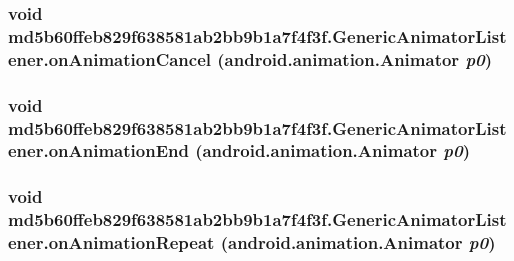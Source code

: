 \hypertarget{classmd5b60ffeb829f638581ab2bb9b1a7f4f3f_1_1_generic_animator_listener_b745db9d1bbb0cb04441a727772e9cf0}{
\subsubsection[{onAnimationCancel}]{\setlength{\rightskip}{0pt plus 5cm}void md5b60ffeb829f638581ab2bb9b1a7f4f3f.GenericAnimatorListener.onAnimationCancel (android.animation.Animator {\em p0})}}
\label{classmd5b60ffeb829f638581ab2bb9b1a7f4f3f_1_1_generic_animator_listener_b745db9d1bbb0cb04441a727772e9cf0}


\hypertarget{classmd5b60ffeb829f638581ab2bb9b1a7f4f3f_1_1_generic_animator_listener_ce339af29a5453d7f7cc1f5dcefd6248}{
\subsubsection[{onAnimationEnd}]{\setlength{\rightskip}{0pt plus 5cm}void md5b60ffeb829f638581ab2bb9b1a7f4f3f.GenericAnimatorListener.onAnimationEnd (android.animation.Animator {\em p0})}}
\label{classmd5b60ffeb829f638581ab2bb9b1a7f4f3f_1_1_generic_animator_listener_ce339af29a5453d7f7cc1f5dcefd6248}


\hypertarget{classmd5b60ffeb829f638581ab2bb9b1a7f4f3f_1_1_generic_animator_listener_e1933b559083185b38a40651ea936d48}{
\subsubsection[{onAnimationRepeat}]{\setlength{\rightskip}{0pt plus 5cm}void md5b60ffeb829f638581ab2bb9b1a7f4f3f.GenericAnimatorListener.onAnimationRepeat (android.animation.Animator {\em p0})}}
\label{classmd5b60ffeb829f638581ab2bb9b1a7f4f3f_1_1_generic_animator_listener_e1933b559083185b38a40651ea936d48}




